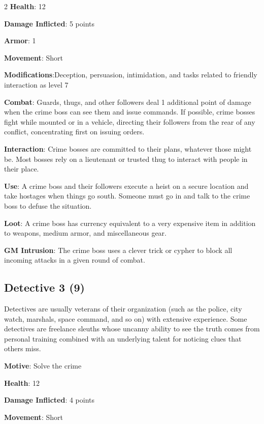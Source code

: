 \begin{multicols}{2}
\textbf{Health}: 12

\textbf{Damage Inflicted}: 5 points

\textbf{Armor}: 1

\textbf{Movement}: Short

\textbf{Modifications}:Deception, persuasion, intimidation, and tasks related to friendly interaction as level 7

\textbf{Combat}: Guards, thugs, and other followers deal 1 additional point of damage when the crime boss can see them and issue commands. If possible, crime bosses fight while mounted or in a vehicle, directing their followers from the rear of any conflict, concentrating first on issuing orders.

\textbf{Interaction}: Crime bosses are committed to their plans, whatever those might be. Most bosses rely on a lieutenant or trusted thug to interact with people in their place.

\textbf{Use}: A crime boss and their followers execute a heist on a secure location and take hostages when things go south. Someone must go in and talk to the crime boss to defuse the situation.

\textbf{Loot}: A crime boss has currency equivalent to a very expensive item in addition to weapons, medium armor, and miscellaneous gear.

\textbf{GM Intrusion}: The crime boss uses a clever trick or cypher to block all incoming attacks in a given round of combat.

\subsection{Detective	3 (9)}

Detectives are usually veterans of their organization (such as the police, city watch, marshals, space command, and so on) with extensive experience. Some detectives are freelance sleuths whose uncanny ability to see the truth comes from personal training combined with an underlying talent for noticing clues that others miss.

\textbf{Motive}: Solve the crime 

\textbf{Health}: 12

\textbf{Damage Inflicted}: 4 points

\textbf{Movement}: Short


\end{multicols}
